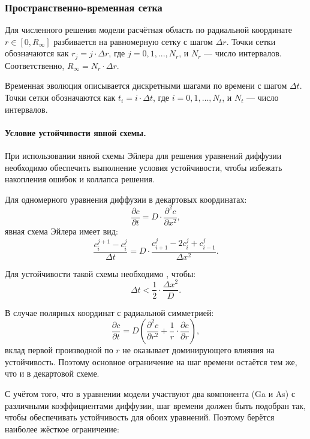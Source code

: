 \documentclass[14pt,oneside]{extarticle}
\begin{document}
\subsubsection{Пространственно-временная сетка}

Для численного решения модели расчётная область по радиальной координате \( r \in [0, R_\infty] \) разбивается на равномерную сетку с шагом \( \Delta r \). Точки сетки обозначаются как \( r_j = j \cdot \Delta r \), где \( j = 0, 1, ..., N_r \), и \( N_r \) — число интервалов. Соответственно, \( R_\infty = N_r \cdot \Delta r \).

Временная эволюция описывается дискретными шагами по времени с шагом \( \Delta t \). Точки сетки обозначаются как \( t_{i}=i\cdot\Delta t \), где \( i=0,1,\ldots,N_{t} \), и \( N_t \) — число интервалов. 

\paragraph{Условие устойчивости явной схемы.}

При использовании явной схемы Эйлера для решения уравнений диффузии необходимо обеспечить выполнение условия устойчивости, чтобы избежать накопления ошибок и коллапса решения.

Для одномерного уравнения диффузии в декартовых координатах:
\[
\frac{\partial c}{\partial t} = D \cdot \frac{\partial^2 c}{\partial x^2},
\]
явная схема Эйлера имеет вид:
\[
\frac{c_i^{j+1} - c_i^j}{\Delta t} = D \cdot \frac{c_{i+1}^j - 2c_i^j + c_{i-1}^j}{\Delta x^2}.
\]

Для устойчивости такой схемы необходимо \cite{leveque2007}, чтобы:
\begin{equation}
\Delta t < \frac{1}{2} \cdot \frac{\Delta x^2}{D}.
\label{eq:cfl_classic}
\end{equation}

В случае полярных координат с радиальной симметрией:
\[
\frac{\partial c}{\partial t} = D \left(
\frac{\partial^2 c}{\partial r^2} + \frac{1}{r} \cdot \frac{\partial c}{\partial r}
\right),
\]
вклад первой производной по \( r \) не оказывает доминирующего влияния на устойчивость. Поэтому основное ограничение на шаг времени остаётся тем же, что и в декартовой схеме.

С учётом того, что в уравнении модели участвуют два компонента (Ga и As) с различными коэффициентами диффузии, шаг времени должен быть подобран так, чтобы обеспечивать устойчивость для обоих уравнений. Поэтому берётся наиболее жёсткое ограничение:
\end{document}
